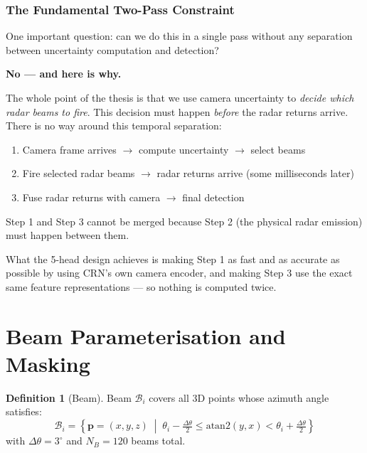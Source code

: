 \documentclass[12pt, a4paper]{article}
\newcommand{\beam}{\mathcal{B}}
\theoremstyle{definition}
\newtheorem{definition}{Definition}[section]
\begin{document}
\subsubsection{The Fundamental Two-Pass Constraint}

\begin{plainbox}
One important question: can we do this in a single pass without any separation
between uncertainty computation and detection?

\textbf{No --- and here is why.}

The whole point of the thesis is that we use camera uncertainty to \emph{decide
which radar beams to fire}. This decision must happen \emph{before} the radar
returns arrive. There is no way around this temporal separation:

\begin{enumerate}
  \item Camera frame arrives $\to$ compute uncertainty $\to$ select beams
  \item Fire selected radar beams $\to$ radar returns arrive (some milliseconds later)
  \item Fuse radar returns with camera $\to$ final detection
\end{enumerate}

Step 1 and Step 3 cannot be merged because Step 2 (the physical radar emission)
must happen between them.

What the 5-head design achieves is making Step 1 as fast and as accurate as
possible by using CRN's own camera encoder, and making Step 3 use the exact same
feature representations --- so nothing is computed twice.
\end{plainbox}

\section{Beam Parameterisation and Masking}
\label{sec:beams}

\begin{definition}[Beam]
  Beam $\beam_i$ covers all 3D points whose azimuth angle satisfies:
  \begin{equation}
    \beam_i = \left\{\mathbf{p}=(x,y,z) \;\middle|\;
    \theta_i - \tfrac{\Delta\theta}{2}
    \leq \mathrm{atan2}(y,x) <
    \theta_i + \tfrac{\Delta\theta}{2}\right\}
    \label{eq:beam_def}
  \end{equation}
  with $\Delta\theta=3^\circ$ and $N_B=120$ beams total.
\end{definition}
\end{document}
